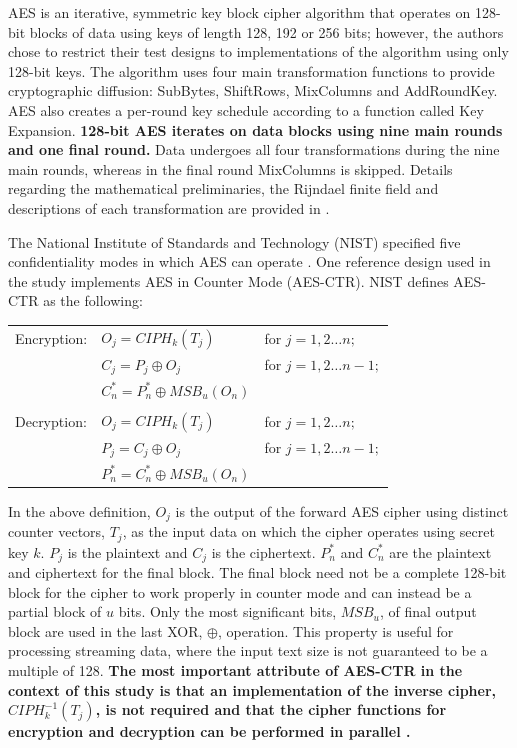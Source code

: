 \documentclass[12pt,journal,compsoc,onecolumn]{IEEEtran}
\begin{document}
AES is an iterative, symmetric key block cipher algorithm that operates on 128-bit blocks of data using keys of length 128, 192 or 256 bits; however, the authors chose to restrict their test designs to implementations of the algorithm using only 128-bit keys. The algorithm uses four main transformation functions to provide cryptographic diffusion: SubBytes, ShiftRows, MixColumns and AddRoundKey. AES also creates a per-round key schedule according to a function called Key Expansion. \textbf{128-bit AES iterates on data blocks using nine main rounds and one final round.} Data undergoes all four transformations during the nine main rounds, whereas in the final round MixColumns is skipped. Details regarding the mathematical preliminaries, the Rijndael finite field and descriptions of each transformation are provided in \cite{13}. 

The National Institute of Standards and Technology (NIST) specified five confidentiality modes in which AES can operate \cite{14}. One reference design used in the study implements AES in Counter Mode (AES-CTR). NIST defines AES-CTR as the following:

\begin{table}[!htb]
	\centering
	\begin{tabular}{l l l}
	Encryption: & $O_j=CIPH_k(T_j)$ & for $j=1,2\dots n;$\\
		 & $C_j=P_j\oplus O_j$ & for $j=1,2\dots n-1;$\\
		 & $C^*_n=P^*_n\oplus MSB_u(O_n)$ & \\
		 \\
	Decryption: & $O_j=CIPH_k(T_j)$ & for $j=1,2\dots n;$\\
		 & $P_j=C_j\oplus O_j$ & for $j=1,2\dots n-1;$\\
		 & $P^*_n=C^*_n\oplus MSB_u(O_n)$ & 
	\end{tabular}
	\label{tab:ctr}
\end{table}

In the above definition, $O_j$ is the output of the forward AES cipher using distinct counter vectors, $T_j$, as the input data on which the cipher operates using secret key $k$. $P_j$ is the plaintext and $C_j$ is the ciphertext. $P^*_n$ and $C^*_n$ are the plaintext and ciphertext for the final block. The final block need not be a complete 128-bit block for the cipher to work properly in counter mode and can instead be a partial block of $u$ bits. Only the most significant bits, $MSB_u$, of final output block are used in the last XOR, $\oplus$, operation.  This property is useful for processing streaming data, where the input text size is not guaranteed to be a multiple of 128\cite{15}\cite{16}. \textbf{The most important attribute of AES-CTR in the context of this study is that an implementation of the inverse cipher, $CIPH^{-1}_k(T_j)$, is not required and that the cipher functions for encryption and decryption can be performed in parallel \cite{10}.}
\end{document}

